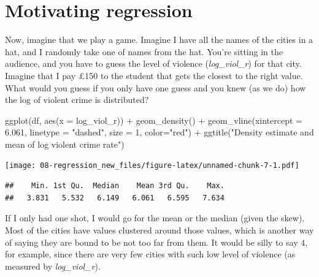 \documentclass[
]{book}
\newenvironment{Shaded}{\begin{snugshade}}{\end{snugshade}}
\newcommand{\AttributeTok}[1]{\textcolor[rgb]{0.77,0.63,0.00}{#1}}
\newcommand{\DecValTok}[1]{\textcolor[rgb]{0.00,0.00,0.81}{#1}}
\newcommand{\FloatTok}[1]{\textcolor[rgb]{0.00,0.00,0.81}{#1}}
\newcommand{\FunctionTok}[1]{\textcolor[rgb]{0.00,0.00,0.00}{#1}}
\newcommand{\NormalTok}[1]{#1}
\newcommand{\SpecialCharTok}[1]{\textcolor[rgb]{0.00,0.00,0.00}{#1}}
\newcommand{\StringTok}[1]{\textcolor[rgb]{0.31,0.60,0.02}{#1}}
\begin{document}
\hypertarget{motivating-regression}{%
\section{Motivating regression}\label{motivating-regression}}

Now, imagine that we play a game. Imagine I have all the names of the cities in a hat, and I randomly take one of names from the hat. You're sitting in the audience, and you have to guess the level of violence (\emph{log\_viol\_r}) for that city. Imagine that I pay £150 to the student that gets the closest to the right value. What would you guess if you only have one guess and you knew (as we do) how the log of violent crime is distributed?

\begin{Shaded}
\begin{Highlighting}[]
\FunctionTok{ggplot}\NormalTok{(df, }\FunctionTok{aes}\NormalTok{(}\AttributeTok{x =}\NormalTok{ log\_viol\_r)) }\SpecialCharTok{+} 
  \FunctionTok{geom\_density}\NormalTok{() }\SpecialCharTok{+}
  \FunctionTok{geom\_vline}\NormalTok{(}\AttributeTok{xintercept =} \FloatTok{6.061}\NormalTok{, }\AttributeTok{linetype =} \StringTok{"dashed"}\NormalTok{, }\AttributeTok{size =} \DecValTok{1}\NormalTok{, }\AttributeTok{color=}\StringTok{"red"}\NormalTok{) }\SpecialCharTok{+}
  \FunctionTok{ggtitle}\NormalTok{(}\StringTok{"Density estimate and mean of log violent crime rate"}\NormalTok{)}
\end{Highlighting}
\end{Shaded}

\texttt{[image: 08-regression\_new\_files/figure-latex/unnamed-chunk-7-1.pdf]}

\begin{Shaded}
\end{Shaded}

\begin{verbatim}
##    Min. 1st Qu.  Median    Mean 3rd Qu.    Max. 
##   3.831   5.532   6.149   6.061   6.595   7.634
\end{verbatim}

If I only had one shot, I would go for the mean or the median (given the skew). Most of the cities have values clustered around those values, which is another way of saying they are bound to be not too far from them. It would be silly to say 4, for example, since there are very few cities with such low level of violence (as measured by \emph{log\_viol\_r}).
\end{document}
